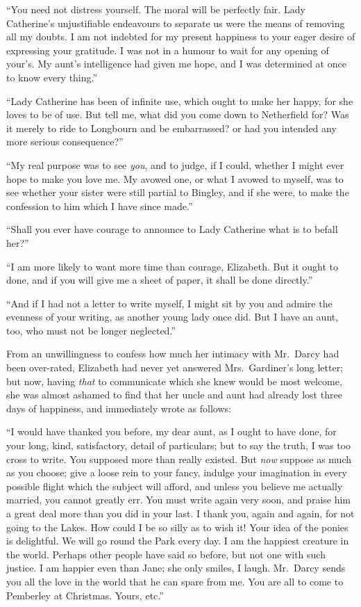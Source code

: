 ``You need not distress yourself.  The moral will be perfectly
fair.  Lady Catherine's unjustifiable endeavours to separate us
were the means of removing all my doubts.  I am not indebted
for my present happiness to your eager desire of expressing
your gratitude.  I was not in a humour to wait for any opening
of your's.  My aunt's intelligence had given me hope, and I was
determined at once to know every thing.''

``Lady Catherine has been of infinite use, which ought to make
her happy, for she loves to be of use.  But tell me, what did
you come down to Netherfield for?  Was it merely to ride to
Longbourn and be embarrassed? or had you intended any more
serious consequence?''

``My real purpose was to see \emph{you}, and to judge, if I could,
whether I might ever hope to make you love me.  My avowed one,
or what I avowed to myself, was to see whether your sister were
still partial to Bingley, and if she were, to make the
confession to him which I have since made.''

``Shall you ever have courage to announce to Lady Catherine
what is to befall her?''

``I am more likely to want more time than courage, Elizabeth.
But it ought to done, and if you will give me a sheet of paper,
it shall be done directly.''

``And if I had not a letter to write myself, I might sit by you
and admire the evenness of your writing, as another young lady
once did.  But I have an aunt, too, who must not be longer
neglected.''

From an unwillingness to confess how much her intimacy with
Mr.\ Darcy had been over-rated, Elizabeth had never yet
answered Mrs.\ Gardiner's long letter; but now, having \emph{that}
to communicate which she knew would be most welcome, she was
almost ashamed to find that her uncle and aunt had already lost
three days of happiness, and immediately wrote as follows:

\bigskip
``I would have thanked you before, my dear aunt, as I ought
to have done, for your long, kind, satisfactory, detail of
particulars; but to say the truth, I was too cross to write.
You supposed more than really existed.  But \emph{now} suppose as
much as you choose; give a loose rein to your fancy, indulge your
imagination in every possible flight which the subject will
afford, and unless you believe me actually married, you cannot
greatly err.  You must write again very soon, and praise him a
great deal more than you did in your last.  I thank you, again
and again, for not going to the Lakes.  How could I be so silly
as to wish it!  Your idea of the ponies is delightful.  We will
go round the Park every day.  I am the happiest creature in the
world.  Perhaps other people have said so before, but not one
with such justice.  I am happier even than Jane; she only
smiles, I laugh.  Mr.\ Darcy sends you all the love in the world
that he can spare from me.  You are all to come to Pemberley at
Christmas.  Yours, etc.''
\bigskip

